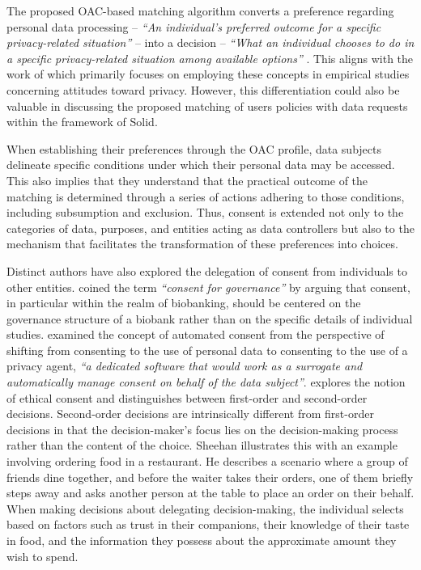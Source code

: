The proposed OAC-based matching algorithm converts a preference regarding personal data processing -- \textit{``An individual’s preferred outcome for a specific privacy-related situation''} -- into a decision -- \textit{``What an individual chooses to do in a specific privacy-related situation among available options''} \citep{colnago_is_2022}.
This aligns with the work of \cite{colnago_is_2022} which primarily focuses on employing these concepts in empirical studies concerning attitudes toward privacy.
However, this differentiation could also be valuable in discussing the proposed matching of users policies with data requests within the framework of Solid.

When establishing their preferences through the OAC profile, data subjects delineate specific conditions under which their personal data may be accessed.
This also implies that they understand that the practical outcome of the matching is determined through a series of actions adhering to those conditions, including subsumption and exclusion.
Thus, consent is extended not only to the categories of data, purposes, and entities acting as data controllers but also to the mechanism that facilitates the transformation of these preferences into choices.

Distinct authors have also explored the delegation of consent from individuals to other entities.
\cite{boers_broad_2015} coined the term \textit{``consent for governance''} by arguing that consent, in particular within the realm of biobanking, should be centered on the governance structure of a biobank rather than on the specific details of individual studies.
\cite{le_metayer_automated_2009} examined the concept of automated consent from the perspective of shifting from consenting to the use of personal data to consenting to the use of a privacy agent, \textit{``a dedicated software that would work as a surrogate and automatically manage consent on behalf of the data subject''}.
\cite{sheehan_can_2011} explores the notion of ethical consent and distinguishes between first-order and second-order decisions.
Second-order decisions are intrinsically different from first-order decisions in that the decision-maker's focus lies on the decision-making process rather than the content of the choice.
Sheehan illustrates this with an example involving ordering food in a restaurant.
He describes a scenario where a group of friends dine together, and before the waiter takes their orders, one of them briefly steps away and asks another person at the table to place an order on their behalf.
When making decisions about delegating decision-making, the individual selects based on factors such as trust in their companions, their knowledge of their taste in food, and the information they possess about the approximate amount they wish to spend.

